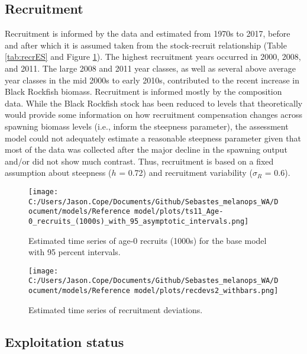 \documentclass[11pt,
  english,
  letterpaper,
]{article}
\begin{document}
\clearpage

\hypertarget{recruitment}{%
\subsection*{Recruitment}\label{recruitment}}

Recruitment is informed by the data and estimated from 1970s to 2017, before and after which it is assumed taken from the stock-recruit relationship (Table \ref{tab:recrES} and Figure \ref{fig:es-recruits}). The highest recruitment years occurred in 2000, 2008, and 2011. The large 2008 and 2011 year classes, as well as several above average year classes in the mid 2000s to early 2010s, contributed to the recent increase in Black Rockfish biomass. Recruitment is informed mostly by the composition data. While the Black Rockfish stock has been reduced to levels that theoretically would provide some information on how recruitment compensation changes across spawning biomass levels (i.e., inform the steepness parameter), the assessment model could not adequately estimate a reasonable steepness parameter given that most of the data was collected after the major decline in the spawning output and/or did not show much contrast. Thus, recruitment is based on a fixed assumption about steepness (\(h\) = 0.72) and recruitment variability (\(\sigma_R\) = 0.6).



\begin{figure}
\centering
\texttt{[image: C:/Users/Jason.Cope/Documents/Github/Sebastes\_melanops\_WA/Document/models/Reference model/plots/ts11\_Age-0\_recruits\_(1000s)\_with\_95\_asymptotic\_intervals.png]}
\caption{Estimated time series of age-0 recruits (1000s) for the base model with 95 percent intervals.\label{fig:es-recruits}}
\end{figure}

\begin{figure}
\centering
\texttt{[image: C:/Users/Jason.Cope/Documents/Github/Sebastes\_melanops\_WA/Document/models/Reference model/plots/recdevs2\_withbars.png]}
\caption{Estimated time series of recruitment deviations.\label{fig:es-recdev}}
\end{figure}

\hypertarget{exploitation-status}{%
\subsection*{Exploitation status}\label{exploitation-status}}
\end{document}
